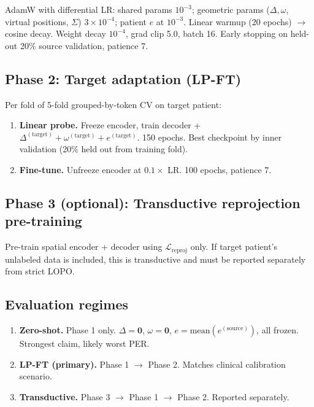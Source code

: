 \documentclass[11pt,letterpaper]{article}
\begin{document}
AdamW with differential LR: shared params $10^{-3}$; geometric params ($\Delta, \omega$, virtual positions, $\Sigma$) $3 {\times} 10^{-4}$; patient $e$ at $10^{-3}$. Linear warmup (20 epochs) $\to$ cosine decay. Weight decay $10^{-4}$, grad clip 5.0, batch 16. Early stopping on held-out 20\% source validation, patience 7.

\subsection{Phase 2: Target adaptation (LP-FT)}

Per fold of 5-fold grouped-by-token CV on target patient:
\begin{enumerate}[leftmargin=2em]
\item \textbf{Linear probe.} Freeze encoder, train decoder + $\Delta^{(\text{target})} + \omega^{(\text{target})} + e^{(\text{target})}$. 150 epochs. Best checkpoint by inner validation (20\% held out from training fold).
\item \textbf{Fine-tune.} Unfreeze encoder at $0.1\times$ LR. 100 epochs, patience 7.
\end{enumerate}

\subsection{Phase 3 (optional): Transductive reprojection pre-training}

Pre-train spatial encoder + decoder using $\mathcal{L}_{\text{reproj}}$ only. If target patient's unlabeled data is included, this is transductive and must be reported separately from strict LOPO.

\subsection{Evaluation regimes}

\begin{enumerate}[leftmargin=2em]
\item \textbf{Zero-shot.} Phase 1 only. $\Delta = \mathbf{0}$, $\omega = \mathbf{0}$, $e = \text{mean}(e^{(\text{source})})$, all frozen. Strongest claim, likely worst PER.
\item \textbf{LP-FT (primary).} Phase 1 $\to$ Phase 2. Matches clinical calibration scenario.
\item \textbf{Transductive.} Phase 3 $\to$ Phase 1 $\to$ Phase 2. Reported separately.
\end{enumerate}
\end{document}
